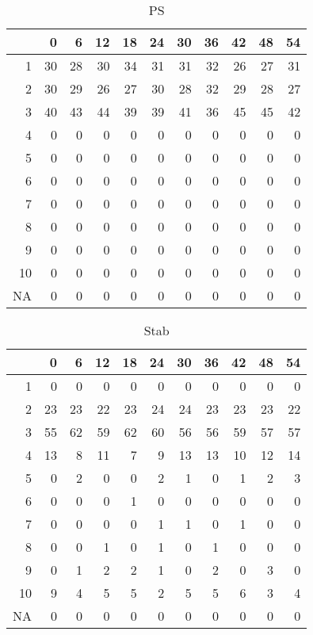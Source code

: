 \documentclass[11pt]{article}
\begin{document}
\begin{table}[H]
\centering
\begin{tabular}{rrrrrrrrrrr}
  \hline
 & 0 & 6 & 12 & 18 & 24 & 30 & 36 & 42 & 48 & 54 \\ 
  \hline
1 & 30 & 28 & 30 & 34 & 31 & 31 & 32 & 26 & 27 & 31 \\ 
  2 & 30 & 29 & 26 & 27 & 30 & 28 & 32 & 29 & 28 & 27 \\ 
  3 & 40 & 43 & 44 & 39 & 39 & 41 & 36 & 45 & 45 & 42 \\ 
  4 & 0 & 0 & 0 & 0 & 0 & 0 & 0 & 0 & 0 & 0 \\ 
  5 & 0 & 0 & 0 & 0 & 0 & 0 & 0 & 0 & 0 & 0 \\ 
  6 & 0 & 0 & 0 & 0 & 0 & 0 & 0 & 0 & 0 & 0 \\ 
  7 & 0 & 0 & 0 & 0 & 0 & 0 & 0 & 0 & 0 & 0 \\ 
  8 & 0 & 0 & 0 & 0 & 0 & 0 & 0 & 0 & 0 & 0 \\ 
  9 & 0 & 0 & 0 & 0 & 0 & 0 & 0 & 0 & 0 & 0 \\ 
  10 & 0 & 0 & 0 & 0 & 0 & 0 & 0 & 0 & 0 & 0 \\ 
  NA & 0 & 0 & 0 & 0 & 0 & 0 & 0 & 0 & 0 & 0 \\ 
   \hline
\end{tabular}
\caption{PS} 
\end{table}
\begin{table}[H]
\centering
\begin{tabular}{rrrrrrrrrrr}
  \hline
 & 0 & 6 & 12 & 18 & 24 & 30 & 36 & 42 & 48 & 54 \\ 
  \hline
1 & 0 & 0 & 0 & 0 & 0 & 0 & 0 & 0 & 0 & 0 \\ 
  2 & 23 & 23 & 22 & 23 & 24 & 24 & 23 & 23 & 23 & 22 \\ 
  3 & 55 & 62 & 59 & 62 & 60 & 56 & 56 & 59 & 57 & 57 \\ 
  4 & 13 & 8 & 11 & 7 & 9 & 13 & 13 & 10 & 12 & 14 \\ 
  5 & 0 & 2 & 0 & 0 & 2 & 1 & 0 & 1 & 2 & 3 \\ 
  6 & 0 & 0 & 0 & 1 & 0 & 0 & 0 & 0 & 0 & 0 \\ 
  7 & 0 & 0 & 0 & 0 & 1 & 1 & 0 & 1 & 0 & 0 \\ 
  8 & 0 & 0 & 1 & 0 & 1 & 0 & 1 & 0 & 0 & 0 \\ 
  9 & 0 & 1 & 2 & 2 & 1 & 0 & 2 & 0 & 3 & 0 \\ 
  10 & 9 & 4 & 5 & 5 & 2 & 5 & 5 & 6 & 3 & 4 \\ 
  NA & 0 & 0 & 0 & 0 & 0 & 0 & 0 & 0 & 0 & 0 \\ 
   \hline
\end{tabular}
\caption{Stab} 
\end{table}
\end{document}
